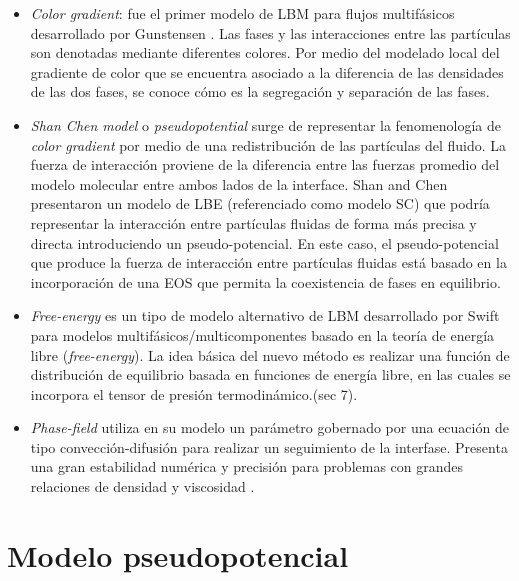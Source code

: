 \begin{itemize}
	
	\item \textit{Color gradient}: fue el primer modelo de LBM para flujos multifásicos desarrollado por Gunstensen \cite{gunstensen1991lattice}. Las fases y las interacciones entre las partículas son denotadas mediante diferentes colores. Por medio del modelado local del gradiente de color que se encuentra asociado a la diferencia de las densidades de las dos fases, se conoce cómo es la segregación y separación de las fases.
	
	\newpage
	\item \textit{Shan Chen model} o \textit{pseudopotential} surge de representar la fenomenología de \textit{color gradient} por medio de una redistribución de las partículas del fluido. La fuerza de interacción proviene de la diferencia entre las fuerzas promedio del modelo molecular  entre ambos lados de la interface. Shan and Chen \cite{shan1993lattice} presentaron un modelo de LBE (referenciado como modelo SC) que podría representar la interacción entre partículas fluidas de forma más precisa y directa introduciendo un pseudo-potencial. En este caso, el pseudo-potencial que produce la fuerza de interacción entre partículas fluidas está basado en la incorporación de una EOS que permita la coexistencia de fases en equilibrio.
	
	\item \textit{Free-energy} es un tipo de modelo alternativo de LBM desarrollado por Swift \cite{swift1995lattice} para modelos multifásicos/multicomponentes basado en la teoría de energía libre (\textit{free-energy}). La idea básica del nuevo método es realizar una función de distribución de equilibrio basada en funciones de energía libre, en las cuales se incorpora el tensor de presión termodinámico.\cite{guo2013lattice}(sec 7).
	
	\item \textit{Phase-field} utiliza en su modelo un parámetro gobernado por una ecuación de tipo convección-difusión para realizar un seguimiento de la interfase. Presenta una gran estabilidad numérica y precisión para problemas con grandes relaciones de densidad y viscosidad \cite{wang2019brief}.
	
	
\end{itemize}





\section{Modelo pseudopotencial}

